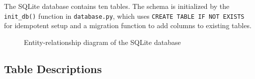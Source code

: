 The SQLite database contains ten tables. The schema is initialized by the \texttt{init\_db()} function in \texttt{database.py}, which uses \texttt{CREATE TABLE IF NOT EXISTS} for idempotent setup and a migration function to add columns to existing tables.

\begin{figure}[H]
\centering
{}
\caption{Entity-relationship diagram of the SQLite database}
\label{fig:er_diagram}
\end{figure}

\subsection{Table Descriptions}

